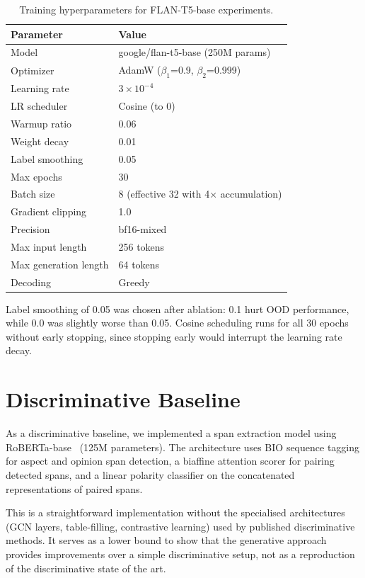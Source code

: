 \documentclass[12pt,a4paper]{report}
\begin{document}
\begin{table}[H]
\centering
\caption{Training hyperparameters for FLAN-T5-base experiments.}
\label{tab:hyperparams}
\small
\begin{tabular}{@{}ll@{}}
\toprule
\textbf{Parameter} & \textbf{Value} \\
\midrule
Model & google/flan-t5-base (250M params) \\
Optimizer & AdamW ($\beta_1$=0.9, $\beta_2$=0.999) \\
Learning rate & $3 \times 10^{-4}$ \\
LR scheduler & Cosine (to 0) \\
Warmup ratio & 0.06 \\
Weight decay & 0.01 \\
Label smoothing & 0.05 \\
Max epochs & 30 \\
Batch size & 8 (effective 32 with 4$\times$ accumulation) \\
Gradient clipping & 1.0 \\
Precision & bf16-mixed \\
Max input length & 256 tokens \\
Max generation length & 64 tokens \\
Decoding & Greedy \\
\bottomrule
\end{tabular}
\end{table}

Label smoothing of 0.05 was chosen after ablation: 0.1 hurt OOD performance, while 0.0 was slightly worse than 0.05. Cosine scheduling runs for all 30 epochs without early stopping, since stopping early would interrupt the learning rate decay.


\section{Discriminative Baseline}

As a discriminative baseline, we implemented a span extraction model using RoBERTa-base~\cite{liu2019roberta} (125M parameters). The architecture uses BIO sequence tagging for aspect and opinion span detection, a biaffine attention scorer for pairing detected spans, and a linear polarity classifier on the concatenated representations of paired spans.

This is a straightforward implementation without the specialised architectures (GCN layers, table-filling, contrastive learning) used by published discriminative methods. It serves as a lower bound to show that the generative approach provides improvements over a simple discriminative setup, not as a reproduction of the discriminative state of the art.
\end{document}
